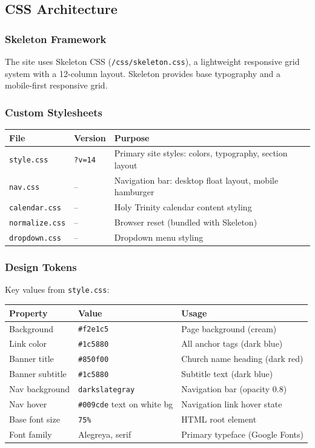 \documentclass[12pt]{article}
\begin{document}
\subsection{CSS Architecture}

\subsubsection{Skeleton Framework}

The site uses Skeleton CSS (\texttt{/css/skeleton.css}), a lightweight responsive grid system with a 12-column layout. Skeleton provides base typography and a mobile-first responsive grid.

\subsubsection{Custom Stylesheets}

\begin{longtable}{p{3.5cm}p{3cm}p{6.5cm}}
\toprule
\textbf{File} & \textbf{Version} & \textbf{Purpose} \\
\midrule
\texttt{style.css} & \texttt{?v=14} & Primary site styles: colors, typography, section layout \\
\texttt{nav.css} & -- & Navigation bar: desktop float layout, mobile hamburger \\
\texttt{calendar.css} & -- & Holy Trinity calendar content styling \\
\texttt{normalize.css} & -- & Browser reset (bundled with Skeleton) \\
\texttt{dropdown.css} & -- & Dropdown menu styling \\
\bottomrule
\end{longtable}

\subsubsection{Design Tokens}

Key values from \texttt{style.css}:

\begin{longtable}{p{4cm}p{4cm}p{5cm}}
\toprule
\textbf{Property} & \textbf{Value} & \textbf{Usage} \\
\midrule
Background & \texttt{\#f2e1c5} & Page background (cream) \\
Link color & \texttt{\#1c5880} & All anchor tags (dark blue) \\
Banner title & \texttt{\#850f00} & Church name heading (dark red) \\
Banner subtitle & \texttt{\#1c5880} & Subtitle text (dark blue) \\
Nav background & \texttt{darkslategray} & Navigation bar (opacity 0.8) \\
Nav hover & \texttt{\#009cde} text on white bg & Navigation link hover state \\
Base font size & \texttt{75\%} & HTML root element \\
Font family & Alegreya, serif & Primary typeface (Google Fonts) \\
\bottomrule
\end{longtable}
\end{document}
